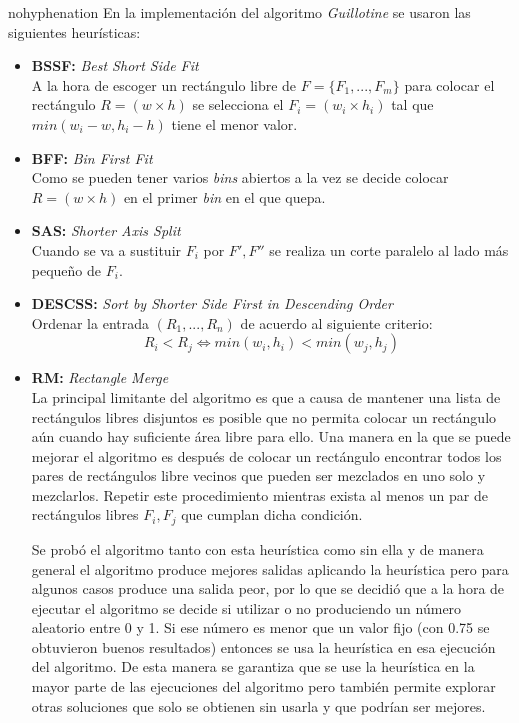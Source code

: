 \documentclass[a4paper,10pt,twocolumn]{article}
\begin{document}
\begin{hyphenrules}{nohyphenation}
En la implementación del algoritmo \textit{Guillotine} se usaron las siguientes heurísticas:
\begin{itemize}
	\item \textbf{BSSF:} \textit{Best Short Side Fit}\\
	A la hora de escoger un rectángulo libre de $F = \{F_1,...,F_m\}$ para colocar el rectángulo $R = (w \times h)$ se selecciona el $F_i = (w_i \times h_i)$ tal que $min(w_i-w,h_i-h)$ tiene el menor valor. 
	\item \textbf{BFF:} \textit{Bin First Fit}\\
	Como se pueden tener varios \textit{bins} abiertos a la vez se decide colocar $R = (w \times h)$ en el primer \textit{bin} en el que quepa.
	\item \textbf{SAS:} \textit{Shorter Axis Split}\\
	Cuando se va a sustituir $F_i$ por $F',F''$ se realiza un corte paralelo al lado más pequeño de $F_i$.
	\item \textbf{DESCSS:} \textit{Sort by Shorter Side First in Descending Order}\\
	Ordenar la entrada $(R_1,...,R_n)$ de acuerdo al siguiente criterio:
	$$R_i < R_j \Longleftrightarrow min(w_i,h_i) < min (w_j,h_j)$$ 
	\item \textbf{RM:} \textit{Rectangle Merge}\\
	La principal limitante del algoritmo es que a causa de mantener una lista de rectángulos libres disjuntos es posible que no permita colocar un rectángulo aún cuando hay suficiente área libre para ello. Una manera en la que se puede mejorar el algoritmo es después de colocar un rectángulo encontrar todos los pares de rectángulos libre vecinos que pueden ser mezclados en uno solo y mezclarlos. Repetir este procedimiento mientras exista al menos un par de rectángulos libres $F_i, F_j$ que cumplan dicha condición.
	
	Se probó el algoritmo tanto con esta heurística como sin ella y de manera general el algoritmo produce mejores salidas aplicando la heurística pero para algunos casos produce una salida peor, por lo que se decidió que a la hora de ejecutar el algoritmo se decide si utilizar o no produciendo un número aleatorio entre 0 y 1. Si ese número es menor que un valor fijo (con 0.75 se obtuvieron buenos resultados) entonces se usa la heurística en esa ejecución del algoritmo. De esta manera se garantiza que se use la heurística en la mayor parte de las ejecuciones del algoritmo pero también permite explorar otras soluciones que solo se obtienen sin usarla y que podrían ser mejores. 
\end{itemize}


\end{hyphenrules}
\end{document}
